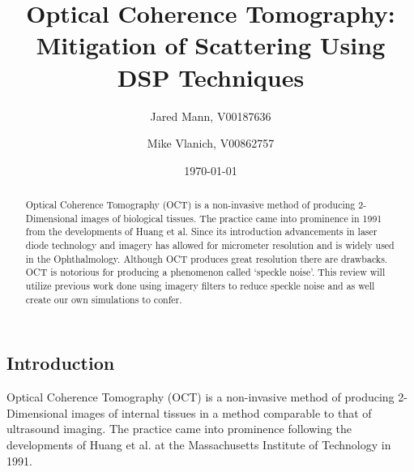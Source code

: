 \documentclass[%
reprint,
showpacs,preprintnumbers,
bibnotes,
amsmath,amssymb,
aps,
pra,
]{revtex4-1}
\begin{document}

	\title{Optical Coherence Tomography: \\ Mitigation of Scattering Using DSP Techniques}

	\author{Jared Mann, V00187636}
	\author{Mike Vlanich, V00862757}

	\date{\today}%


	\begin{abstract}
Optical Coherence Tomography (OCT) is a non-invasive method of producing 2-Dimensional images of biological tissues. The practice came into prominence in 1991 from the developments of Huang et al. Since its introduction advancements in laser diode technology and imagery has allowed for micrometer resolution and is widely used in the Ophthalmology.\cite{bhende_optical_2018} Although OCT produces great resolution there are drawbacks. OCT is notorious for producing a phenomenon called ‘speckle noise’. This review will utilize previous work done using imagery filters to reduce speckle noise and as well create our own simulations to confer.
	\end{abstract}

	\maketitle
	\tableofcontents

	\makeatletter
	\let\toc@pre\relax
	\let\toc@post\relax
	\makeatother

	\listoffigures
	\listoftables

	\subsection{\label{sec:level1}		Introduction}
	Optical Coherence Tomography (OCT) is a non-invasive method of producing 2-Dimensional images of internal tissues in a method comparable to that of ultrasound imaging.\cite{Huang91}\cite{sander_optical_2011} The practice came into prominence following the developments of Huang et al. at the Massachusetts Institute of Technology in 1991. \cite{Huang91}
\end{document}
